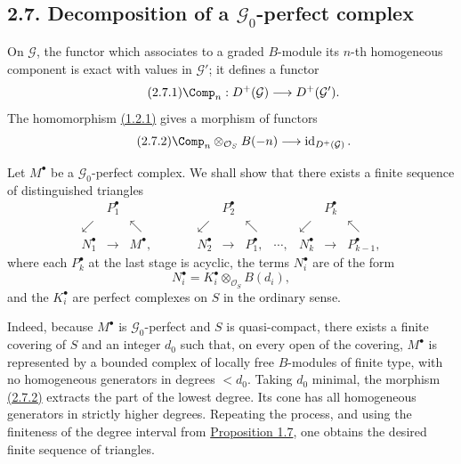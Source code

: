 \subsection*{2.7. Decomposition of a \(\mathcal G_0\)-perfect complex}
On \(\mathcal G\), the functor which associates to a graded \(B\)-module its \(n\)-th homogeneous component is exact with values in \(\mathcal G'\); it defines a functor
\begin{equation}\tag{2.7.1}
  \Comp_n:D^+(\mathcal G)\longrightarrow D^+(\mathcal G').
\end{equation}
The homomorphism \hyperlink{sga6.e06.eq.1-2-1}{(1.2.1)} gives a morphism of functors
\begin{equation}\tag{2.7.2}
  \Comp_n\otimes_{\mathcal O_S}B(-n)\longrightarrow
  \operatorname{id}_{D^+(\mathcal G)}.
\end{equation}

Let \(M^\bullet\) be a \(\mathcal G_0\)-perfect complex. We shall show that there exists a finite sequence of distinguished triangles
\[
\begin{array}{ccccccccccc}
& P_1^\bullet &&&& P_2^\bullet &&&& P_k^\bullet &\\
\swarrow && \nwarrow && \swarrow && \nwarrow && \swarrow && \nwarrow\\
N_1^\bullet & \longrightarrow & M^\bullet, & \qquad &
N_2^\bullet & \longrightarrow & P_1^\bullet, & \cdots, &
N_k^\bullet & \longrightarrow & P_{k-1}^\bullet,
\end{array}
\]
where each \(P_k^\bullet\) at the last stage is acyclic, the terms \(N_i^\bullet\) are of the form
\[
  N_i^\bullet=K_i^\bullet\otimes_{\mathcal O_S}B(d_i),
\]
and the \(K_i^\bullet\) are perfect complexes on \(S\) in the ordinary sense.

Indeed, because \(M^\bullet\) is \(\mathcal G_0\)-perfect and \(S\) is quasi-compact, there exists a finite covering of \(S\) and an integer \(d_0\) such that, on every open of the covering, \(M^\bullet\) is represented by a bounded complex of locally free \(B\)-modules of finite type, with no homogeneous generators in degrees \(<d_0\). Taking \(d_0\) minimal, the morphism \hyperlink{sga6.e06.eq.2-7-2}{(2.7.2)} extracts the part of the lowest degree. Its cone has all homogeneous generators in strictly higher degrees. Repeating the process, and using the finiteness of the degree interval from \hyperlink{sga6.e06.prop.1-7}{Proposition 1.7}, one obtains the desired finite sequence of triangles.

